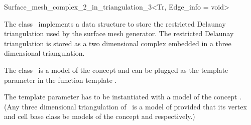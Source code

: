 

\begin{ccRefClass}{Surface_mesh_complex_2_in_triangulation_3<Tr, Edge_info = void>}


\ccDefinition
  
The class \ccRefName\  implements a data structure to store
the restricted Delaunay triangulation used by the surface mesh generator.
The restricted Delaunay triangulation is stored as a two dimensional
complex embedded in a three dimensional triangulation.


The class  \ccRefName\ is a model of the concept 
and can be plugged as the template parameter 
in the function template .


The template parameter  has to be instantiated
with a model of the concept .
(Any three dimensional   triangulation of
\cgal\ is a model of 
provided that its vertex and cell base class be models
of the concept  and
respectively.)





\ccIsModel









\end{ccRefClass}
